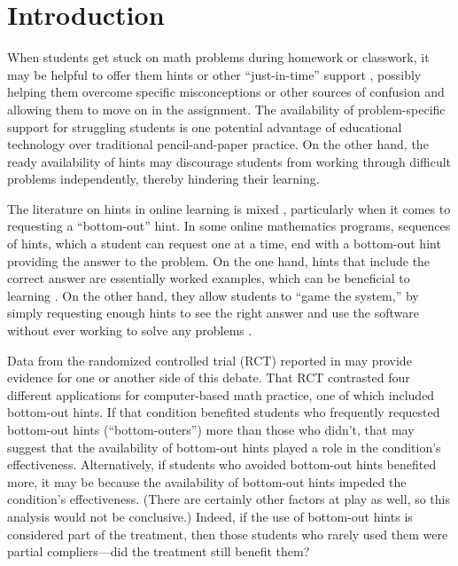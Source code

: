 \documentclass[]{article}
\begin{document}
\clearpage

\section{Introduction}

When students get stuck on math problems during homework or classwork, it may be helpful to offer them hints or other ``just-in-time'' support \cite[e.g.,][]{jit}, possibly helping them overcome specific misconceptions or other sources of confusion and allowing them to move on in the assignment.
The availability of problem-specific support for struggling students is one potential advantage of educational technology over traditional pencil-and-paper practice.
On the other hand, the ready availability of hints may discourage students from working through difficult problems independently, thereby hindering their learning.

The literature on hints in online learning is mixed \citep[see, e.g.,][]{aleven2016help,goldin2012learner,sales2021student}, particularly when it comes to requesting a ``bottom-out'' hint. In some online mathematics programs, sequences of hints, which a student can request one at a time, end with a bottom-out hint providing the answer to the problem. On the one hand, hints that include the correct answer are essentially worked examples, which can be beneficial to learning \citep[e.g.]{sweller1985use}. On the other hand, they allow students to ``game the system,'' by simply requesting enough hints to see the right answer and use the software without ever working to solve any problems \citep[e.g.][]{guo2008trying}.

Data from the randomized controlled trial (RCT) reported in \citet{impactPaper} may provide evidence for one or another side of this debate.
That RCT contrasted four different applications for computer-based math practice, one of which included bottom-out hints.
If that condition benefited students who frequently requested bottom-out hints (``bottom-outers'') more than those who didn't, that may suggest that the availability of bottom-out hints played a role in the condition's effectiveness.
Alternatively, if students who avoided bottom-out hints benefited more, it may be because the availability of bottom-out hints impeded the condition's effectiveness.
(There are certainly other factors at play as well, so this analysis would not be conclusive.)
Indeed, if the use of bottom-out hints is considered part of the treatment, then those students who rarely used them were partial compliers---did the treatment still benefit them?
\end{document}
